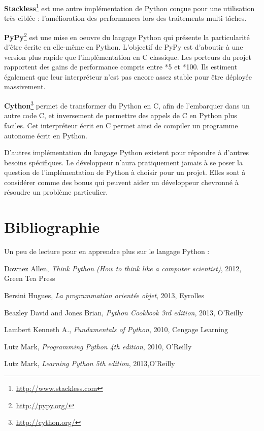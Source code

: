 \documentclass[12pt, a4paper]{article}
\begin{document}
\textbf{Stackless}\footnote{\url{http://www.stackless.com}} est une autre implémentation de Python conçue pour une utilisation très ciblée : l'amélioration des performances lors des traitements multi-tâches.

\textbf{PyPy}\footnote{\url{http://pypy.org/}} est une mise en oeuvre du langage Python qui présente la particularité d'être écrite en elle-même en Python. L'objectif de PyPy est d'aboutir à une version plus rapide que l'implémentation en C classique. Les porteurs du projet rapportent des gains de performance compris entre *5 et *100. Ils estiment également que leur interpréteur n'est pas encore assez stable pour être déployée massivement.

\textbf{Cython}\footnote{\url{http://cython.org/}} permet de transformer du Python en C, afin de l'embarquer dans un autre code C, et inversement de permettre des appels de C en Python plus faciles. Cet interpréteur écrit en C permet ainsi de compiler un programme autonome écrit en Python.

D'autres implémentation du langage Python existent pour répondre à d'autres besoins spécifiques. Le développeur n'aura pratiquement jamais à se poser la question de l'implémentation de Python à choisir pour un projet. Elles sont à considérer comme des bonus qui peuvent aider un développeur chevronné à résoudre un problème particulier.



\newpage
\section*{Bibliographie}

Un peu de lecture pour en apprendre plus sur le langage Python :

\vspace{2cm}

Downez Allen, \textit{Think Python (How to think like a computer scientist)}, 2012, Green Tea Press

Bersini Hugues, \textit{La programmation orientée objet}, 2013, Eyrolles

Beazley David and Jones Brian, \textit{Python Cookbook 3rd edition}, 2013, O'Reilly

Lambert Kenneth A., \textit{Fundamentals of Python}, 2010, Cengage Learning

Lutz Mark, \textit{Programming Python 4th edition}, 2010,	O'Reilly

Lutz Mark, \textit{Learning Python 5th edition}, 2013,O'Reilly
\end{document}
